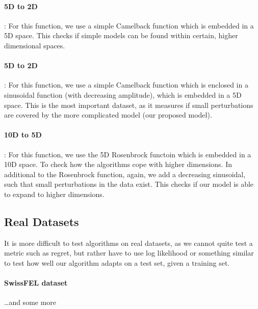\paragraph{5D to 2D}: For this function, we use a simple Camelback function which is embedded in a 5D space.
This checks if simple models can be found within certain, higher dimensional spaces.
\paragraph{5D to 2D}: For this function, we use a simple Camelback function which is enclosed in a sinusoidal function (with decreasing amplitude), which is embedded in a 5D space.
This is the most important dataset, as it measures if small perturbations are covered by the more complicated model (our proposed model).
\paragraph{10D to 5D}: For this function, we use the 5D Rosenbrock functoin which is embedded in a 10D space.
To check how the algorithms cope with higher dimensions.
In additional to the Rosenbrock function, again, we add a decreasing sinusoidal, such that small perturbations in the data exist.
This checks if our model is able to expand to higher dimensions.

\subsection{Real Datasets}
It is more difficult to test algorithms on real datasets, as we cannot quite test a metric such as regret, but rather have to use log likelihood or something similar to test how well our algorithm adapts on a test set, given a training set.

\paragraph{SwissFEL dataset}
\dots and some more 


